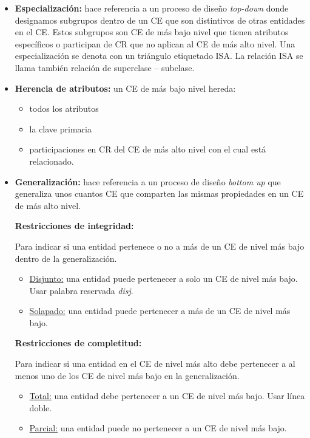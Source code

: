 \documentclass[12pt,a4paper]{report}
\begin{document}
		\begin{itemize}
			\item \textbf{Especialización:} hace referencia a un proceso de diseño \textit{top-down} donde designamos subgrupos dentro de un CE que son distintivos de otras entidades en el CE. Estos subgrupos son CE de más bajo nivel que tienen atributos específicos o participan de CR que no aplican al CE de más alto nivel. Una especialización se denota con un triángulo etiquetado ISA. La relación ISA se llama también relación de superclase – subclase.
			\item \textbf{Herencia de atributos:} un CE de más bajo nivel hereda:
				\begin{itemize}
					\item todos los atributos
					\item la clave primaria
					\item participaciones en CR del CE de más alto nivel con el cual está relacionado. 
				\end{itemize}
			\item \textbf{Generalización:} hace referencia a un proceso de diseño \textit{bottom up} que generaliza unos cuantos CE que comparten las mismas propiedades en un CE de más alto nivel.
			
			\vspace{7mm}
			\textbf{Restricciones de integridad:}
           \par Para indicar si una entidad pertenece o no a más de un CE de nivel más bajo dentro de la generalización.
         		\begin{itemize}
         			\item \underline{Disjunto:} una entidad puede pertenecer a solo un CE de nivel más bajo. Usar palabra reservada \textit{disj}.
					\item \underline{Solapado:} una entidad puede pertenecer a más de un CE de nivel más bajo.
				\end{itemize}         		  

			\vspace{7mm}			
			\textbf{Restricciones de completitud:} 
			\par Para indicar si una entidad en el CE de nivel más alto debe pertenecer a al menos uno de los CE de nivel más bajo en la generalización.
				\begin{itemize}
					\item \underline{Total:} una entidad debe pertenecer a un CE de nivel más bajo. Usar línea doble.
					\item \underline{Parcial:} una entidad puede no pertenecer a un CE de nivel más bajo.
				\end{itemize}
		\end{itemize}
\end{document}
